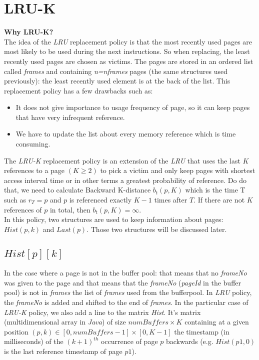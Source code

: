 \documentclass{article}
\begin{document}
\section{LRU-K}
\textbf{Why LRU-K?}\\
The idea of the \textit{LRU} replacement policy is that the most recently used pages are most likely to be used during the next instructions. So when replacing, the least recently used pages are chosen as victims. The pages are stored in an ordered list called \textit{frames} and containing \textit{n=nframes} pages (the same structures used previously): the least recently used element is at the back of the list. This replacement policy has a few drawbacks such as:
\begin{itemize}
    \item It does not give importance to usage frequency of page, so it can keep pages that have very infrequent reference.
  \item We have to update the list about every memory reference which is time consuming.
\end{itemize}
The \textit{LRU-K} replacement policy is an extension of the \textit{LRU} that uses the last $K$ references to a page $(K\geq2)$ to pick a victim and only keep pages with shortest access interval time or in other terms a greatest probability of reference. Do do that, we need to calculate Backward K-distance $b_t(p,K)$ which is the time T such as $r_T=p$ and $p$ is referenced exactly $K-1$ times after $T$. If there are not $K$ references of $p$ in total, then $b_t(p,K)=\infty$.\\
In this policy, two structures are used to keep information about pages: $Hist(p,k)$ and $Last(p)$. Those two structures will be discussed later\citep{O'Neil1993}.

\subsection{$Hist[p][k]$}

In the case where a page is not in the buffer pool: that means that no \textit{frameNo} was given to the page and that means that the \textit{frameNo} (\textit{pageId} in the buffer pool) is not in \textit{frames} the list of \textit{frames} used from the bufferpool. In \textit{LRU} policy, the \textit{frameNo} is added and shifted to the end of \textit{frames}. In the particular case of \textit{LRU-K} policy, we also add a line to the matrix \textit{Hist}. It's matrix (multidimensional array in \textit{Java}) of size $numBuffers \times K$ containing at a given position $(p,k) \in [0,numBuffers-1]\times[0,K-1]$ the timestamp (in milliseconds) of the ${(k+1)}^{th}$ occurrence of page $p$ backwards (e.g. $Hist(p1,0)$ is the last reference timestamp of page $p1$).
\end{document}
